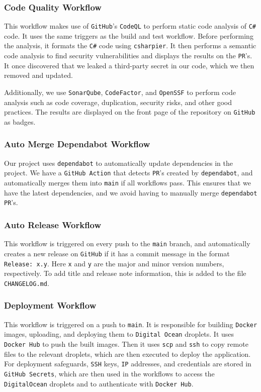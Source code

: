 \subsubsection{Code Quality Workflow}
This workflow makes use of \texttt{GitHub}'s \texttt{CodeQL}\cite{codeql} 
to perform static code analysis of \texttt{C\#} code.
It uses the same triggers as the build and test workflow.
Before performing the analysis, it formats the \texttt{C\#} code using 
\texttt{csharpier}\cite{csharpier}.
It then performs a semantic code analysis to find security 
vulnerabilities and displays the results on the \texttt{PR}'s.
It once discovered that we leaked a third-party secret 
in our code, which we then removed and updated.

Additionally, we use \texttt{SonarQube}\cite{sonarqube}, 
\texttt{CodeFactor}\cite{codefactor}, and \texttt{OpenSSF}\cite{Openssf} 
to perform code analysis such as code coverage, duplication, 
security risks, and other good practices.
The results are displayed on the front page of the repository 
on \texttt{GitHub} as badges.

\subsubsection{Auto Merge Dependabot Workflow}
Our project uses \texttt{dependabot} to automatically update
dependencies in the project.
We have a \texttt{GitHub Action} that detects \texttt{PR}'s 
created by \texttt{dependabot}, and automatically merges 
them into \texttt{main} if all workflows pass.
This ensures that we have the latest dependencies,
and we avoid having to manually merge \texttt{dependabot} 
\texttt{PR}'s.

\subsubsection{Auto Release Workflow}
This workflow is triggered on every push to the 
\texttt{main} branch, and automatically 
creates a new release on \texttt{GitHub} if it has
a commit message in the format \texttt{Release: x.y}. 
Here \texttt{x} and \texttt{y} are the major and minor version numbers, respectively.
To add title and release note information, 
this is added to the file \texttt{CHANGELOG.md}.

\subsubsection{Deployment Workflow}
This workflow is triggered on a push to \texttt{main}.
It is responsible for building \texttt{Docker} images, 
uploading, and deploying them to \texttt{Digital Ocean} droplets.
It uses \texttt{Docker Hub} to push the built images.
Then it uses \texttt{scp} and \texttt{ssh} to copy remote files 
to the relevant droplets, which are then executed to 
deploy the application. For deployment safeguards,
\texttt{SSH} keys, \texttt{IP} addresses, and credentials are stored in \texttt{GitHub Secrets},
which are then used in the workflows to access the \texttt{DigitalOcean} droplets and to 
authenticate with \texttt{Docker Hub}.


